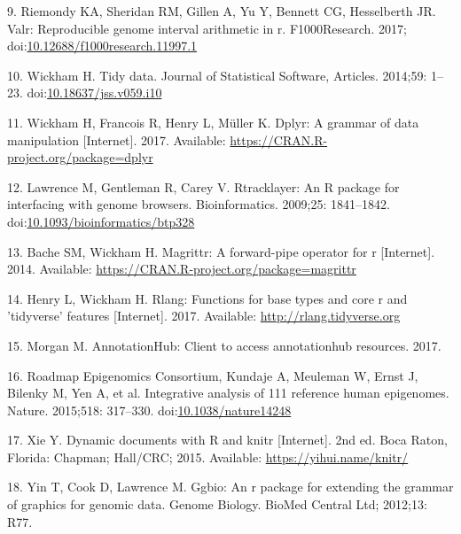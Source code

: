\documentclass[10pt,letterpaper]{article}
\begin{document}
\leavevmode\hypertarget{ref-Kent2017}{}%
9. Riemondy KA, Sheridan RM, Gillen A, Yu Y, Bennett CG, Hesselberth JR.
Valr: Reproducible genome interval arithmetic in r. F1000Research. 2017;
doi:\href{https://doi.org/10.12688/f1000research.11997.1}{10.12688/f1000research.11997.1}

\leavevmode\hypertarget{ref-Wickham2014-jc}{}%
10. Wickham H. Tidy data. Journal of Statistical Software, Articles.
2014;59: 1--23.
doi:\href{https://doi.org/10.18637/jss.v059.i10}{10.18637/jss.v059.i10}

\leavevmode\hypertarget{ref-Wickham2017-dplyr}{}%
11. Wickham H, Francois R, Henry L, Müller K. Dplyr: A grammar of data
manipulation {[}Internet{]}. 2017. Available:
\url{https://CRAN.R-project.org/package=dplyr}

\leavevmode\hypertarget{ref-Lawrence2009-nt}{}%
12. Lawrence M, Gentleman R, Carey V. Rtracklayer: An R package for
interfacing with genome browsers. Bioinformatics. 2009;25: 1841--1842.
doi:\href{https://doi.org/10.1093/bioinformatics/btp328}{10.1093/bioinformatics/btp328}

\leavevmode\hypertarget{ref-R-magrittr}{}%
13. Bache SM, Wickham H. Magrittr: A forward-pipe operator for r
{[}Internet{]}. 2014. Available:
\url{https://CRAN.R-project.org/package=magrittr}

\leavevmode\hypertarget{ref-R-rlang}{}%
14. Henry L, Wickham H. Rlang: Functions for base types and core r and
'tidyverse' features {[}Internet{]}. 2017. Available:
\url{http://rlang.tidyverse.org}

\leavevmode\hypertarget{ref-R-ahub}{}%
15. Morgan M. AnnotationHub: Client to access annotationhub resources.
2017.

\leavevmode\hypertarget{ref-Roadmap_Epigenomics_Consortium2015-pr}{}%
16. Roadmap Epigenomics Consortium, Kundaje A, Meuleman W, Ernst J,
Bilenky M, Yen A, et al. Integrative analysis of 111 reference human
epigenomes. Nature. 2015;518: 317--330.
doi:\href{https://doi.org/10.1038/nature14248}{10.1038/nature14248}

\leavevmode\hypertarget{ref-R-knitr}{}%
17. Xie Y. Dynamic documents with R and knitr {[}Internet{]}. 2nd ed.
Boca Raton, Florida: Chapman; Hall/CRC; 2015. Available:
\url{https://yihui.name/knitr/}

\leavevmode\hypertarget{ref-R-ggbio}{}%
18. Yin T, Cook D, Lawrence M. Ggbio: An r package for extending the
grammar of graphics for genomic data. Genome Biology. BioMed Central
Ltd; 2012;13: R77.

\nolinenumbers
\end{document}

